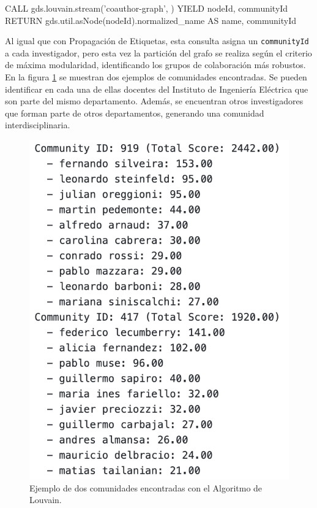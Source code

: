 \documentclass[journal]{IEEEtran}
\begin{document}
\begin{sflisting}[style=sparql,caption= Detección de comunidades con el algoritmo de Louvain,label=codigo_louvain]
	CALL gds.louvain.stream('coauthor-graph', {})
	YIELD nodeId, communityId
	RETURN gds.util.asNode(nodeId).normalized_name
	AS name, communityId
\end{sflisting}

Al igual que con Propagación de Etiquetas, esta consulta asigna un \texttt{communityId} a cada investigador, pero esta vez la partición del grafo se realiza según el criterio de máxima modularidad, identificando los grupos de colaboración más robustos. En la figura \ref{fig:comunidades} se muestran dos ejemplos de comunidades encontradas. Se pueden identificar en cada una de ellas docentes del Instituto de Ingeniería Eléctrica que son parte del mismo departamento. Además, se encuentran otros investigadores que forman parte de otros departamentos, generando una comunidad interdisciplinaria.

\begin{figure}[t]
	\centering
	\includegraphics[width=\linewidth]{imagenes/comunidades.png}
	\caption{Ejemplo de dos comunidades encontradas con el Algoritmo de Louvain.}
	\label{fig:comunidades}
\end{figure}
\end{document}
